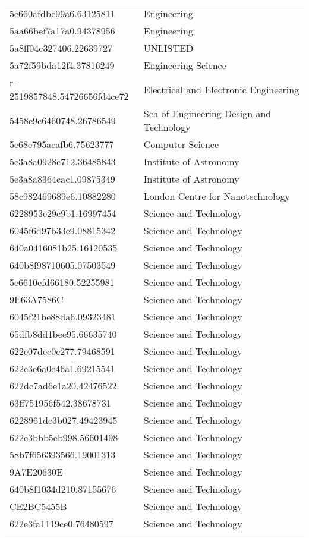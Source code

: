 \begin{tabular}{ll}
5e660afdbe99a6.63125811 & Engineering \\
5aa66bef7a17a0.94378956 & Engineering \\
5a8ff04c327406.22639727 & UNLISTED \\
5a72f59bda12f4.37816249 & Engineering Science \\
r-2519857848.54726656fd4ce72 & Electrical and Electronic Engineering \\
5458e9c6460748.26786549 & Sch of Engineering Design and Technology \\
5e68e795acafb6.75623777 & Computer Science \\
5e3a8a0928c712.36485843 & Institute of Astronomy \\
5e3a8a8364cac1.09875349 & Institute of Astronomy \\
58c982469689e6.10882280 & London Centre for Nanotechnology \\
6228953e29c9b1.16997454 & Science and Technology \\
6045f6d97b33e9.08815342 & Science and Technology \\
640a0416081b25.16120535 & Science and Technology \\
640b8f98710605.07503549 & Science and Technology \\
5e6610efd66180.52255981 & Science and Technology \\
9E63A7586C & Science and Technology \\
6045f21be88da6.09323481 & Science and Technology \\
65dfb8dd1bee95.66635740 & Science and Technology \\
622e07dec0c277.79468591 & Science and Technology \\
622e3e6a0e46a1.69215541 & Science and Technology \\
622dc7ad6e1a20.42476522 & Science and Technology \\
63ff751956f542.38678731 & Science and Technology \\
6228961dc3b027.49423945 & Science and Technology \\
622e3bbb5eb998.56601498 & Science and Technology \\
58b7f656393566.19001313 & Science and Technology \\
9A7E20630E & Science and Technology \\
640b8f1034d210.87155676 & Science and Technology \\
CE2BC5455B & Science and Technology \\
622e3fa1119ce0.76480597 & Science and Technology \\

\end{tabular}
